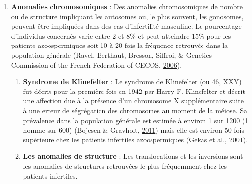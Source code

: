 \documentclass[12pt,twoside]{reedthesis}
\providecommand{\tightlist}{%
  \setlength{\itemsep}{0pt}\setlength{\parskip}{0pt}}
\theoremstyle{definition}
\theoremstyle{definition}
\theoremstyle{remark}
\begin{document}
  \begin{enumerate}
  \def\labelenumi{\arabic{enumi}.}
  \setcounter{enumi}{1}
  \tightlist
  \item
    \textbf{Anomalies chromosomiques} : Des anomalies chromosomiques de
    nombre ou de structure impliquant les autosomes ou, le plus souvent,
    les gonosomes, peuvent être impliquées dans des cas d'infertilité
    masculine. Le pourcentage d'individus concernés varie entre 2 et 8\%
    et peut atteindre 15\% pour les patients azoospermiques soit 10 à 20
    fois la fréquence retrouvée dans la population générale (Ravel,
    Berthaut, Bresson, Siffroi, \& Genetics Commission of the French
    Federation of CECOS, \protect\hyperlink{ref-Ravel2006}{2006}).
  
    \begin{enumerate}
    \def\labelenumii{\alph{enumii}.}
    \tightlist
    \item
      \textbf{Syndrome de Klinefelter} : Le syndrome de Klinefelter (ou
      46, XXY) fut décrit pour la première fois en 1942 par Harry F.
      Klinefelter et décrit une affection due à la présence d'un
      chromosome X supplémentaire suite à une erreur de ségrégation des
      chromosomes au moment de la méiose. Sa prévalence dans la population
      générale est estimée à environ 1 sur 1200 (1 homme sur 600) (Bojesen
      \& Gravholt, \protect\hyperlink{ref-Bojesen2011}{2011}) mais elle
      est environ 50 fois supérieure chez les patients infertiles
      azoospermiques (Gekas et al.,
      \protect\hyperlink{ref-Gekas2001}{2001}).\\
    \item
      \textbf{Les anomalies de structure} : Les translocations et les
      inversions sont les anomalies de structures retrouvées le plus
      fréquemment chez les patients infertiles.
  

\end{enumerate}
\end{enumerate}
\end{document}
